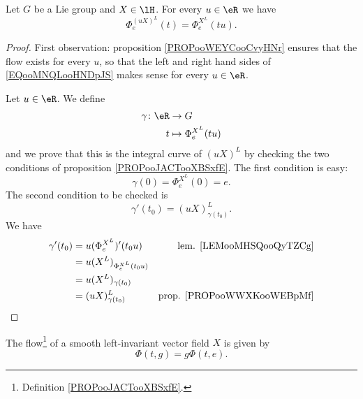 \begin{lemma}        \label{LEMooNZCJooSltfLg}
	Let \( G\) be a Lie group and \( X\in\lH\). For every \( u\in \eR\) we have
	\begin{equation}        \label{EQooMNQLooHNDpJS}
		\Phi_e^{(uX)^L}(t)=\Phi_e^{X^L}(tu).
	\end{equation}
\end{lemma}

\begin{proof}
	First observation: proposition \ref{PROPooWEYCooCvyHNr} ensures that the flow exists for every \( u\), so that the left and right hand sides of \eqref{EQooMNQLooHNDpJS} makes sense for every \( u\in \eR\).

	Let \( u\in \eR\). We define
	\begin{equation}
		\begin{aligned}
			\gamma\colon \eR & \to G                    \\
			t                & \mapsto \Phi_e^{X^L}(tu)
		\end{aligned}
	\end{equation}
	and we prove that this is the integral curve of \( (uX)^L\) by checking the two conditions of proposition \ref{PROPooJACTooXBSxfE}. The first condition is easy:
	\begin{equation}
		\gamma(0)=\Phi_e^{X^L}(0)=e.
	\end{equation}
	The second condition to be checked is
	\begin{equation}
		\gamma'(t_0)=(uX)^L_{\gamma(t_0)}.
	\end{equation}
	We have
	\begin{subequations}
		\begin{align}
			\gamma'(t_0) & =u(\Phi^{X^L}_e)'(t_0u)      & \text{lem. \ref{LEMooMHSQooQyTZCg}}   \\
			             & =u(X^L)_{\Phi_e^{X^L}(t_0u)}                                         \\
			             & =u(X^L)_{\gamma(t_0)}                                                \\
			             & =(uX)^L_{\gamma(t_0)}        & \text{prop. \ref{PROPooWWXKooWEBpMf}}
		\end{align}
	\end{subequations}
\end{proof}

\begin{proposition} \label{PROPooUXFQooIwimav}
	The flow\footnote{Definition \ref{PROPooJACTooXBSxfE}.} of a smooth left-invariant vector field \( X\) is given by
	\begin{equation}
		\Phi(t,g)=g\Phi(t,e).
	\end{equation}
\end{proposition}

